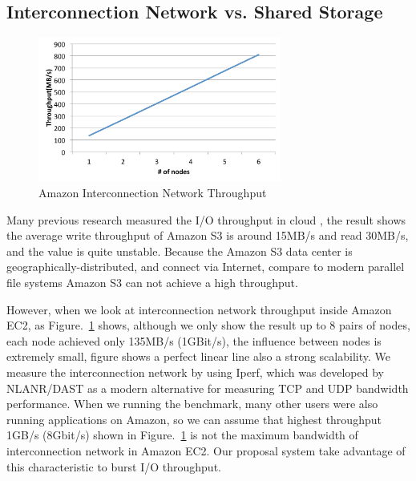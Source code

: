 \subsection{Interconnection Network vs. Shared Storage}
\begin{figure}
\centering
\end{figure}
\begin{figure}
\centering
\includegraphics[width=8cm]{img/amazon_throughput}
\caption{Amazon Interconnection Network Throughput}
\label{background:amazon throughput}
\end{figure}
Many previous research measured the I/O throughput in cloud \cite{Chiba,Transactions_a_la_carte,
Interactive_Use_of_Cloud_Services,Amazon_S3_for_Science_Grids,anevaluation}, the result shows the
average write throughput of Amazon S3 is around 15MB/s and read 30MB/s, and the value is quite
unstable\cite{anevaluation}.
Because the Amazon S3 data center is geographically-distributed, and connect via Internet, compare
to modern parallel file systems Amazon S3 can not achieve a high throughput.

However, when we look at interconnection network throughput inside Amazon EC2, as Figure.~\ref{background:amazon throughput} shows, although we only show the result up to 8 pairs of nodes, each
node achieved only 135MB/s (1GBit/s), the influence between nodes is extremely small, figure shows a perfect linear line also a strong scalability.
We measure the interconnection network by using Iperf\cite{iperf}, which was developed by NLANR/DAST
as a modern alternative for measuring TCP and UDP bandwidth performance.
When we running the
benchmark, many other users were also running applications on Amazon, so we can assume that highest
throughput 1GB/s (8Gbit/s) shown in Figure.~\ref{background:amazon throughput} is not the
maximum bandwidth of interconnection network in Amazon EC2.
Our proposal system take advantage of this characteristic to burst I/O throughput.

